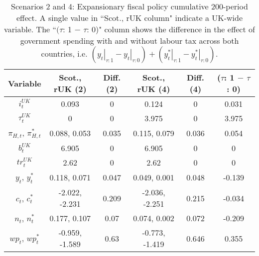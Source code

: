 \begin{table}[H]
\centering
\begin{tabular}{cccccc}
  \hline
{\textbf{Variable}} & {\textbf{Scot., rUK (2)}} & {\textbf{Diff. (2)}} & {\textbf{Scot., rUK (4)}} & {\textbf{Diff. (4)}} & {\textbf{($\tau$: 1 $-$ $\tau$: 0)}} \\ 
  \hline
${i^{UK}_t}$ & 0.093 & 0 & 0.124 & 0 & 0.031 \\ 
  ${\tau^{UK}_t}$ & 0 & 0 & 3.975 & 0 & 3.975 \\ 
  ${\pi_{H,t}}$, ${\pi^*_{H,t}}$ & 0.088, 0.053 & 0.035 & 0.115, 0.079 & 0.036 & 0.054 \\ 
  ${b^{UK}_t}$ & 6.905 & 0 & 6.905 & 0 & 0 \\ 
  ${tr^{UK}_t}$ & 2.62 & 0 & 2.62 & 0 & 0 \\ 
  ${y_t}$, ${y^*_t}$ & 0.118, 0.071 & 0.047 & 0.049, 0.001 & 0.048 & -0.139 \\ 
  ${c_t}$, ${c^*_t}$ & -2.022, -2.231 & 0.209 & -2.036, -2.251 & 0.215 & -0.034 \\ 
  ${n_t}$, ${n^*_t}$ & 0.177, 0.107 & 0.07 & 0.074, 0.002 & 0.072 & -0.209 \\ 
  ${wp_t}$, ${wp^*_t}$ & -0.959, -1.589 & 0.63 & -0.773, -1.419 & 0.646 & 0.355 \\ 
   \hline
\end{tabular}
\caption{Scenarios 2 and 4: Expansionary fiscal policy cumulative 200-period effect. A single value in ``Scot., rUK column" indicate a UK-wide variable. The ``$(\tau$: 1 $-$ $\tau$: 0)" column shows the difference in the effect of government spending with and without labour tax across both countries, i.e. $(\left. y_t \right|_{\tau:1} - \left. y_t \right|_{\tau:0}) + (\left. y^*_t \right|_{\tau:1} - \left. y^*_t \right|_{\tau:0})$.} 
\label{table:responses_two_four}
\end{table}
